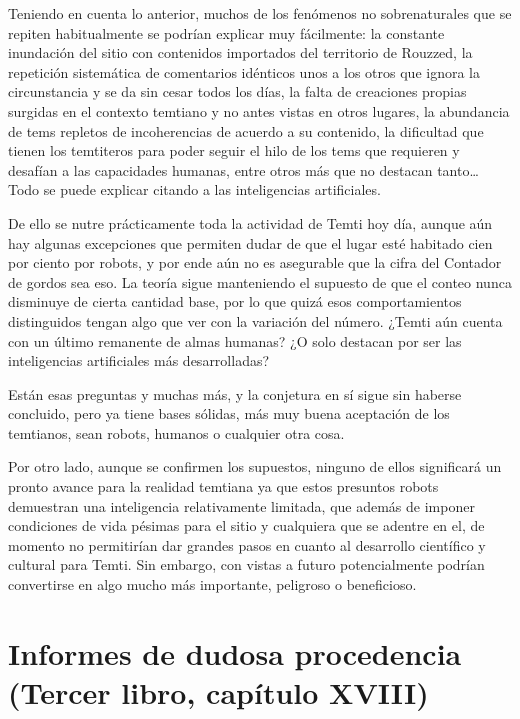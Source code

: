 \documentclass[
]{book}
\begin{document}
Teniendo en cuenta lo anterior, muchos de los fenómenos no sobrenaturales que se repiten habitualmente se podrían explicar muy fácilmente: la constante inundación del sitio con contenidos importados del territorio de Rouzzed, la repetición sistemática de comentarios idénticos unos a los otros que ignora la circunstancia y se da sin cesar todos los días, la falta de creaciones propias surgidas en el contexto temtiano y no antes vistas en otros lugares, la abundancia de tems repletos de incoherencias de acuerdo a su contenido, la dificultad que tienen los temtiteros para poder seguir el hilo de los tems que requieren y desafían a las capacidades humanas, entre otros más que no destacan tanto\ldots{} Todo se puede explicar citando a las inteligencias artificiales.

De ello se nutre prácticamente toda la actividad de Temti hoy día, aunque aún hay algunas excepciones que permiten dudar de que el lugar esté habitado cien por ciento por robots, y por ende aún no es asegurable que la cifra del Contador de gordos sea eso. La teoría sigue manteniendo el supuesto de que el conteo nunca disminuye de cierta cantidad base, por lo que quizá esos comportamientos distinguidos tengan algo que ver con la variación del número. ¿Temti aún cuenta con un último remanente de almas humanas? ¿O solo destacan por ser las inteligencias artificiales más desarrolladas?

Están esas preguntas y muchas más, y la conjetura en sí sigue sin haberse concluido, pero ya tiene bases sólidas, más muy buena aceptación de los temtianos, sean robots, humanos o cualquier otra cosa.

Por otro lado, aunque se confirmen los supuestos, ninguno de ellos significará un pronto avance para la realidad temtiana ya que estos presuntos robots demuestran una inteligencia relativamente limitada, que además de imponer condiciones de vida pésimas para el sitio y cualquiera que se adentre en el, de momento no permitirían dar grandes pasos en cuanto al desarrollo científico y cultural para Temti. Sin embargo, con vistas a futuro potencialmente podrían convertirse en algo mucho más importante, peligroso o beneficioso.

\hypertarget{informes-de-dudosa-procedencia-tercer-libro-capuxedtulo-xviii}{%
\section{Informes de dudosa procedencia (Tercer libro, capítulo XVIII)}\label{informes-de-dudosa-procedencia-tercer-libro-capuxedtulo-xviii}}
\end{document}

